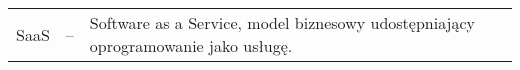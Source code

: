 \begin{tabular}{@{} l l p{} @{}}
    SaaS & -- & Software as a Service, model biznesowy udostępniający oprogramowanie jako usługę. \\
\end{tabular}


